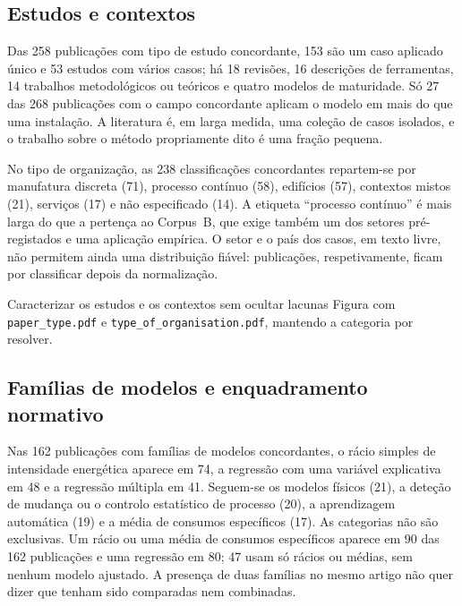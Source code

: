\subsection{Estudos e contextos}

Das 258 publicações com tipo de estudo concordante, 153 são um caso aplicado
único e 53 estudos com vários casos; há 18 revisões, 16 descrições de
ferramentas, 14 trabalhos metodológicos ou teóricos e quatro modelos de
maturidade. Só 27 das 268 publicações com o campo concordante aplicam o
modelo em mais do que uma instalação. A literatura é, em larga medida, uma
coleção de casos isolados, e o trabalho sobre o método propriamente dito é
uma fração pequena.

No tipo de organização, as 238 classificações concordantes repartem-se por
manufatura discreta (71), processo contínuo (58), edifícios (57), contextos
mistos (21), serviços (17) e não especificado (14). A etiqueta ``processo
contínuo'' é mais larga do que a pertença ao Corpus~B, que exige também um
dos setores pré-registados e uma aplicação empírica. O setor e o país dos
casos, em texto livre, não permitem ainda uma distribuição fiável:  publicações, respetivamente, ficam por classificar depois da
normalização. 

{Caracterizar os estudos e os contextos sem ocultar lacunas}
{Figura com \texttt{paper\_type.pdf} e \texttt{type\_of\_organisation.pdf},
mantendo a categoria por resolver. }%

\subsection{Famílias de modelos e enquadramento normativo}

Nas 162 publicações com famílias de modelos concordantes, o rácio simples de
intensidade energética aparece em 74, a regressão com uma variável
explicativa em 48 e a regressão múltipla em 41. Seguem-se os modelos físicos
(21), a deteção de mudança ou o controlo estatístico de processo (20), a
aprendizagem automática (19) e a média de consumos específicos (17). As
categorias não são exclusivas. Um rácio ou uma média de consumos específicos
aparece em 90 das 162 publicações e uma regressão em 80; 47 usam só rácios
ou médias, sem nenhum modelo ajustado. A presença de duas famílias no mesmo
artigo não quer dizer que tenham sido comparadas nem combinadas.

